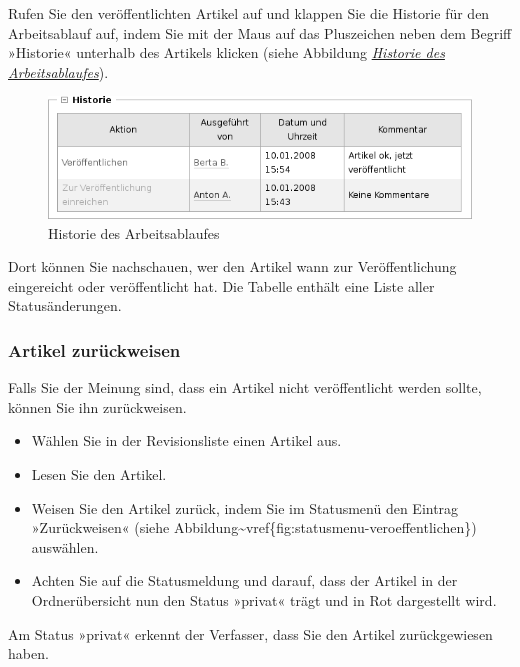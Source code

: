 \documentclass[a4paper,12pt,ngerman]{manual}
\begin{document}
Rufen Sie den veröffentlichten Artikel auf und klappen Sie die Historie für
den Arbeitsablauf auf, indem Sie mit der Maus auf das Pluszeichen neben dem
Begriff »Historie« unterhalb des Artikels klicken (siehe
Abbildung \hyperlink{fig-historie-arbeitsablauf}{\emph{Historie des Arbeitsablaufes}}).
\hypertarget{fig-historie-arbeitsablauf}{}\begin{figure}[htbp]
\centering

\includegraphics{historie-arbeitsablauf.png}
\caption{Historie des Arbeitsablaufes}\end{figure}

Dort können Sie nachschauen, wer den Artikel wann zur Veröffentlichung
eingereicht oder veröffentlicht hat. Die Tabelle enthält eine Liste aller
Statusänderungen.


\hypertarget{sec-artik-redig-veroff-1}{}\subsubsection{Artikel zurückweisen}

Falls Sie der Meinung sind, dass ein Artikel nicht veröffentlicht werden
sollte, können Sie ihn zurückweisen.
\begin{itemize}
\item {} 
Wählen Sie in der Revisionsliste einen Artikel aus.

\item {} 
Lesen Sie den Artikel.

\item {} 
Weisen Sie den Artikel zurück, indem Sie im Statusmenü den Eintrag
»Zurückweisen« (siehe Abbildung\textasciitilde{}vref\{fig:statusmenu-veroeffentlichen\})
auswählen.

\item {} 
Achten Sie auf die Statusmeldung und darauf, dass der Artikel in der
Ordnerübersicht nun den Status »privat« trägt und in Rot dargestellt wird.

\end{itemize}

Am Status »privat« erkennt der Verfasser, dass Sie den Artikel
zurückgewiesen haben.
\end{document}
